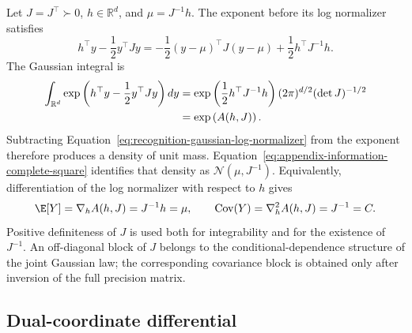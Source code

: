 Let \(J=J^\top\succ0\), \(h\in\mathbb R^d\), and \(\mu=J^{-1}h\). The exponent before its log normalizer satisfies
\begin{equation}
h^\top y-\frac12y^\top Jy
=-\frac12(y-\mu)^\top J(y-\mu)
+\frac12h^\top J^{-1}h.
\label{eq:appendix-information-complete-square}
\end{equation}
The Gaussian integral is
\begin{align}
\int_{\mathbb R^d}
\exp\left(h^\top y-\frac12y^\top Jy\right)dy
&=\exp\left(\frac12h^\top J^{-1}h\right)
(2\pi)^{d/2}(\det J)^{-1/2}\notag\\
&=\exp\left(A(h,J)\right).
\label{eq:appendix-information-normalizer-integral}
\end{align}
Subtracting Equation~\eqref{eq:recognition-gaussian-log-normalizer} from the exponent therefore produces a density of unit mass. Equation~\eqref{eq:appendix-information-complete-square} identifies that density as \(\mathcal N(\mu,J^{-1})\). Equivalently, differentiation of the log normalizer with respect to \(h\) gives
\begin{equation}
\E[Y]=\nabla_h A(h,J)=J^{-1}h=\mu,
\qquad
\operatorname{Cov}(Y)=\nabla_h^2A(h,J)=J^{-1}=C.
\label{eq:appendix-information-moment-derivatives}
\end{equation}
Positive definiteness of \(J\) is used both for integrability and for the existence of \(J^{-1}\). An off-diagonal block of \(J\) belongs to the conditional-dependence structure of the joint Gaussian law; the corresponding covariance block is obtained only after inversion of the full precision matrix.

\subsection{Dual-coordinate differential}
\label{sec:gaussian-dual-coordinate-proof}

